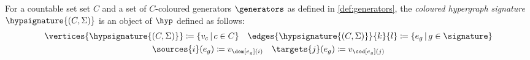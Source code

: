 \begin{definition}\label{def:coloured-hypergraph-signature}
    For a countable set set \(C\) and a set of \(C\)-coloured generators
    \(\generators\) as defined in \cref{def:generators}, the
    \emph{coloured hypergraph signature}
    \(\hypsignature{(C,\Sigma)}\) is an object of \(\hyp\) defined as
    follows:
    \begin{gather*}
        \vertices{\hypsignature{(C,\Sigma)}} \coloneqq \{ v_c \,|\, c \in C\}
        \quad
        \edges{\hypsignature{(C,\Sigma)}}{k}{l} \coloneqq \{ e_g \,|\, g \in \signature\}
        \\
        \sources{i}(e_g) \coloneqq v_{\dom[e_g](i)}
        \quad
        \targets{j}(e_g) \coloneqq v_{\cod[e_g](j)}
    \end{gather*}
\end{definition}

